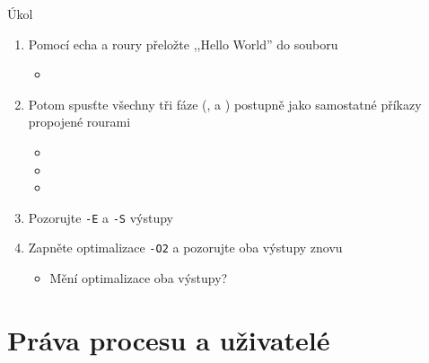 \begin{frame}{Úkol}

  \begin{enumerate}
    \item Pomocí echa a roury přeložte ,,Hello World''  do souboru
    \begin{itemize}
      \item {}
    \end{itemize}

    \item Potom spusťte všechny tři fáze (,  a )
      postupně jako samostatné příkazy propojené rourami
    \begin{itemize}
      \item {}
      \item {}
      \item {}
    \end{itemize}

    \item Pozorujte \texttt{-E} a \texttt{-S} výstupy
    \item Zapněte optimalizace \texttt{-O2} a pozorujte oba výstupy znovu
    \begin{itemize}
      \item Mění optimalizace oba výstupy?
    \end{itemize}
  \end{enumerate}

\end{frame}

\section{Práva procesu a uživatelé}
\frame{\sectionpage}



